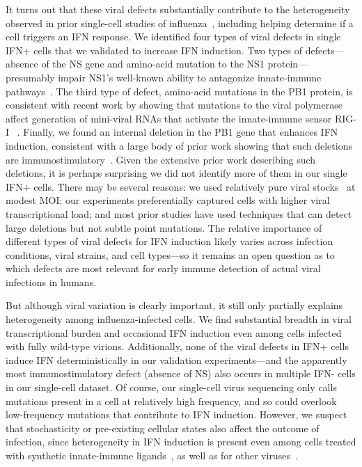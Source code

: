 \documentclass[10pt,letterpaper]{article}
\begin{document}
It turns out that these viral defects substantially contribute to the heterogeneity observed in prior single-cell studies of influenza~\cite{russell2018extreme, steuerman2018dissection, heldt2015single, sjaastad2018distinct}, including helping determine if a cell triggers an IFN response.
We identified four types of viral defects in single IFN+ cells that we validated to increase IFN induction. 
Two types of defects---absence of the NS gene and amino-acid mutation to the NS1 protein---presumably impair NS1's well-known ability to antagonize innate-immune pathways~\cite{garcia1998influenza, hale2008multifunctional}.
The third type of defect, amino-acid mutations in the PB1 protein, is consistent with recent work by showing that mutations to the viral polymerase affect generation of mini-viral RNAs that activate the innate-immune sensor RIG-I~\cite{velthuis2018mini} .
Finally, we found an internal deletion in the PB1 gene that enhances IFN induction, consistent with a large body of prior work showing that such deletions are immunostimulatory~\cite{baum2010preference, tapia2013defective, boergeling2015evidence, dimmock2015cloned}.
Given the extensive prior work describing such deletions, it is perhaps surprising we did not identify more of them in our single IFN+ cells.
There may be several reasons: we used relatively pure viral stocks~\cite{xue2016propagation} at modest MOI; our experiments preferentially captured cells with higher viral transcriptional load; and most prior studies have used techniques that can detect large deletions but not subtle point mutations.
The relative importance of different types of viral defects for IFN induction likely varies across infection conditions, viral strains, and cell types---so it remains an open question as to which defects are most relevant for early immune detection of actual viral infections in humans.

But although viral variation is clearly important, it still only partially explains heterogeneity among influenza-infected cells.
We find substantial breadth in viral transcriptional burden and occasional IFN induction even among cells infected with fully wild-type virions.
Additionally, none of the viral defects in IFN+ cells induce IFN deterministically in our validation experiments---and the apparently most immunostimulatory defect (absence of NS) also occurs in multiple IFN- cells in our single-cell dataset.
Of course, our single-cell virus sequencing only calls mutations present in a cell at relatively high frequency, and so could overlook low-frequency mutations that contribute to IFN induction.
However, we suspect that stochasticity or pre-existing cellular states also affect the outcome of infection, since heterogeneity in IFN induction is present even among cells treated with synthetic innate-immune ligands~\cite{shalek2013single, shalek2014single, wimmers2018single, bhushal2017cell}, as well as for other viruses~\cite{oneal2018west}.
\end{document}
